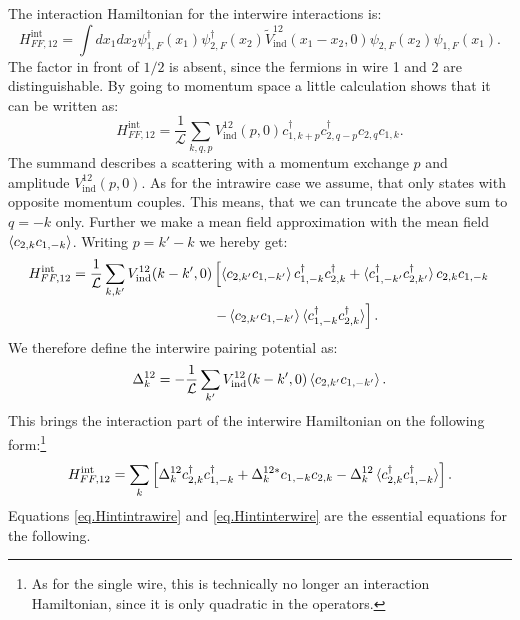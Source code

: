 The interaction Hamiltonian for the interwire interactions is:
\begin{equation}
H^\text{int}_{FF,12} = \int dx_1 dx_2 \psi^\dagger_{1,F}(x_1)\psi^\dagger_{2,F}(x_2) \tilde{V}_{\text{ind}}^{12}(x_1-x_2,0) \psi_{2,F}(x_2)\psi_{1,F}(x_1).
\label{eq.Hint12realspace}
\end{equation}
The factor in front of $1/2$ is absent, since the fermions in wire 1 and 2 are distinguishable. By going to momentum space a little calculation shows that it can be written as:
\begin{equation}
H^\text{int}_{FF,12} = \frac{1}{\mathcal{L}}\sum_{k,q,p} V_{\text{ind}}^{12}(p,0) c^\dagger_{1,k + p} c^\dagger_{2, q - p} c_{2, q} c_{1, k}. 
\label{eq.Hint12momentumspace}
\end{equation}
The summand describes a scattering with a momentum exchange $p$ and amplitude $V_{\text{ind}}^{12}(p,0)$. As for the intrawire case we assume, that only states with opposite momentum couples. This means, that we can truncate the above sum to $q = -k$ only. Further we make a mean field approximation with the mean field $\braket{c_{2,k}c_{1,-k}}$. Writing $p = k' - k$ we hereby get:
\begin{align}
H^\text{int}_{FF,12} = \frac{1}{\mathcal{L}} \sum_{k,k'} V_{\text{ind}}^{12}(k-k',0) & \left[\braket{c_{2,k'}c_{1,-k'}}c^\dagger_{1,-k}c^\dagger_{2,k} + \braket{c^\dagger_{1,-k'}c^\dagger_{2,k'}}c_{2,k}c_{1,-k} \right. \nonumber \\
& \left. - \braket{c_{2,k'}c_{1,-k'}}\braket{c^\dagger_{1,-k}c^\dagger_{2,k}} \right]. \nonumber
\end{align}
We therefore define the interwire pairing potential as:
\begin{equation}
\Delta^{12}_k = -\frac{1}{\mathcal{L}} \sum_{k'} V_{\text{ind}}^{12}(k-k',0)\braket{c_{2,k'}c_{1,-k'}}.
\end{equation}
This brings the interaction part of the interwire Hamiltonian on the following form:\footnote{As for the single wire, this is technically no longer an interaction Hamiltonian, since it is only quadratic in the operators.}
\begin{equation}
H^\text{int}_{FF,12} = \sum_{k} \left[\Delta^{12}_k c^\dagger_{2,k}c^\dagger_{1,-k} + \Delta^{12 *}_k c_{1,-k}c_{2,k} - \Delta^{12}_k\braket{c^\dagger_{2,k}c^\dagger_{1,-k}} \right].
\label{eq.Hintinterwire}
\end{equation}
Equations \ref{eq.Hintintrawire} and \ref{eq.Hintinterwire} are the essential equations for the following. 

